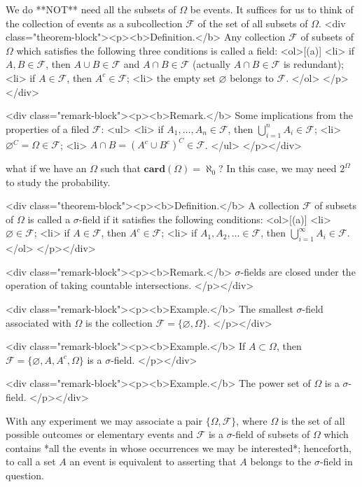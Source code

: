 We do **NOT** need all the subsets of $\Omega$ be events. It suffices for us to think of the collection of events as a subcollection $\mathcal{F}$ of the set of all subsets of $\Omega$.
<div class="theorem-block"><p><b>Definition.</b> 
Any collection $\mathcal{F}$ of subsets of $\Omega$ which satisfies the following three conditions is called a field:
<ol>[(a)]
    <li> if $A, B \in \mathcal{F}$, then $A \cup B \in \mathcal{F}$ and $A \cap B \in \mathcal{F}$ (actually $A\cap B \in \mathcal{F}$ is redundant); 
    <li> if $A \in \mathcal{F}$, then $A^c \in \mathcal{F}$;
    <li> the empty set $\varnothing$ belongs to $\mathcal{F}$.
</ol>
</p></div>

<div class="remark-block"><p><b>Remark.</b> 
Some implications from the properties of a filed $\mathcal{F}$:
<ul>
    <li> if $A_1, \dots, A_n \in \mathcal{F}$, then $\bigcup_{i=1}^n A_i \in \mathcal{F}$;
    <li> $\varnothing^C = \Omega \in \mathcal{F}$;
    <li> $A \cap B = (A^c \cup B^c)^C \in \mathcal{F}$.
</ul>
</p></div>

\begin{question}
what if we have an $\Omega$ such that $\mathbf{card}(\Omega) = \aleph_0$? In this case, we may need $2^\Omega$ to study the probability. 
\end{question}

<div class="theorem-block"><p><b>Definition.</b> 
A collection $\mathcal{F}$ of subsets of $\Omega$ is called a $\sigma$-field if it satisfies the following conditions: 
<ol>[(a)]
    <li> $\varnothing \in \mathcal{F}$;
    <li> if $A \in \mathcal{F}$, then $A^c \in \mathcal{F}$;
    <li> if $A_1, A_2, \dots \in \mathcal{F}$, then $\bigcup_{i=1}^\infty A_i \in \mathcal{F}$.
</ol>
</p></div>

<div class="remark-block"><p><b>Remark.</b> 
$\sigma$-fields are closed under the operation of taking countable intersections.
</p></div>

<div class="remark-block"><p><b>Example.</b> 
The smallest $\sigma$-field associated with $\Omega$ is the collection $\mathcal{F} = \{\varnothing, \Omega \}$.
</p></div>

<div class="remark-block"><p><b>Example.</b> 
If $A \subset \Omega$, then $\mathcal{F} = \{\varnothing, A, A^c, \Omega \}$ is a $\sigma$-field. 
</p></div>

<div class="remark-block"><p><b>Example.</b> 
The power set of $\Omega$ is a $\sigma$-field.
</p></div>

With any experiment we may associate a pair $\{\Omega, \mathcal{F}\}$, where $\Omega$ is the set of all possible outcomes or elementary events and $\mathcal{F}$ is a $\sigma$-field of subsets of $\Omega$ which contains *all the events in whose occurrences we may be interested*; henceforth, to call a set $A$ an event is equivalent to asserting that $A$ belongs to the $\sigma$-field in question. 


